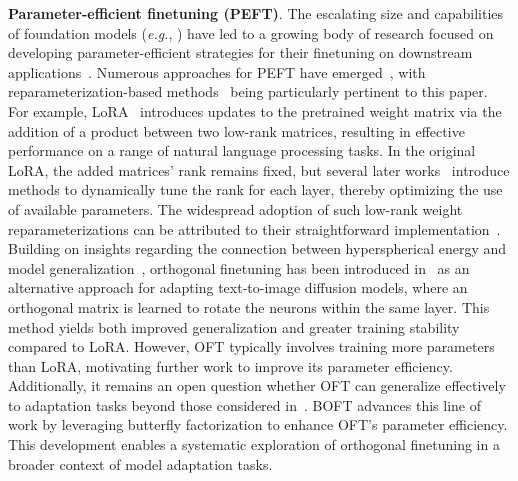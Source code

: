 \textbf{Parameter-efficient finetuning (PEFT)}. The escalating size and capabilities of foundation models (\emph{e.g.}, \cite{brown2020language,radford2021learning,rombach2022high,kirillov2023segment}) have led to a growing body of research focused on developing parameter-efficient strategies for their finetuning on downstream applications~\cite{treviso2023efficient,ding2023parameter,lialin2023scaling}. Numerous approaches for PEFT have emerged~\cite{houlsby2019parameter,aghajanyan2020intrinsic,hulora2022,edalati2022krona,wang2022adamix,gheini2021cross,zaken2022bitfit,guo2020parameter,sung2021training,ansell2022composable,lester2021power,li2021prefix,vu2022spot,he2021towards,mao2021unipelt,karimi2021compacter,liu2022few,sung2022lst,chen2022parameter,jia2022visual,chen2022adaptformer,zhang2022neural,jie2023fact,lian2022scaling,luo2023towards}, with reparameterization-based methods~\cite{aghajanyan2020intrinsic,hulora2022,edalati2022krona} being particularly pertinent to this paper. For example, LoRA~\cite{hulora2022} introduces updates to the pretrained weight matrix via the addition of a product between two low-rank matrices, resulting in effective performance on a range of natural language processing tasks. In the original LoRA, the added matrices’ rank remains fixed, but several later works~\cite{zhang2022adaptive,valipour2022dylora,zhang2023increlora} introduce methods to dynamically tune the rank for each layer, thereby optimizing the use of available parameters. The widespread adoption of such low-rank weight reparameterizations can be attributed to their straightforward implementation~\cite{dettmers2023qlora,zi2023delta,chavan2023one}. Building on insights regarding the connection between hyperspherical energy and model generalization~\cite{liu2018learning,liu2021orthogonal}, orthogonal finetuning has been introduced in~\cite{qiu2023controlling} as an alternative approach for adapting text-to-image diffusion models, where an orthogonal matrix is learned to rotate the neurons within the same layer. This method yields both improved generalization and greater training stability compared to LoRA. However, OFT typically involves training more parameters than LoRA, motivating further work to improve its parameter efficiency. Additionally, it remains an open question whether OFT can generalize effectively to adaptation tasks beyond those considered in~\cite{qiu2023controlling}. BOFT advances this line of work by leveraging butterfly factorization to enhance OFT’s parameter efficiency. This development enables a systematic exploration of orthogonal finetuning in a broader context of model adaptation tasks.

